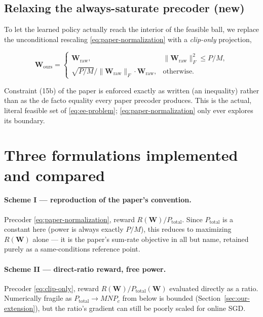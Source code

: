 \documentclass[11pt]{article}
\begin{document}
\subsection{Relaxing the always-saturate precoder (new)}

To let the learned policy actually reach the interior of the feasible ball,
we replace the unconditional rescaling \eqref{eq:paper-normalization} with a
\emph{clip-only} projection,

\begin{equation}
  \mathbf{W}_{\text{ours}} =
  \begin{cases}
    \mathbf{W}_{\text{raw}}, & \|\mathbf{W}_{\text{raw}}\|_F^2 \le P/M, \\[4pt]
    \sqrt{P/M}/\|\mathbf{W}_{\text{raw}}\|_F \cdot \mathbf{W}_{\text{raw}}, & \text{otherwise.}
  \end{cases}
  \label{eq:clip-only}
\end{equation}

Constraint (15b) of the paper is enforced exactly as written (an inequality)
rather than as the de facto equality every paper precoder produces. This is
the actual, literal feasible set of \eqref{eq:ee-problem}; \eqref{eq:paper-normalization}
only ever explores its boundary.

\section{Three formulations implemented and compared}
\label{sec:schemes}

\paragraph{Scheme I --- reproduction of the paper's convention.} Precoder
\eqref{eq:paper-normalization}, reward $R(\mathbf{W})/P_{\text{total}}$. Since
$P_{\text{total}}$ is a constant here (power is always exactly $P/M$), this
reduces to maximizing $R(\mathbf{W})$ alone --- it is the paper's sum-rate
objective in all but name, retained purely as a same-conditions reference
point.

\paragraph{Scheme II --- direct-ratio reward, free power.} Precoder
\eqref{eq:clip-only}, reward $R(\mathbf{W})/P_{\text{total}}(\mathbf{W})$
evaluated directly as a ratio. Numerically fragile as
$P_{\text{total}}\to MNP_c$ from below is bounded (Section~\ref{sec:our-extension}),
but the ratio's gradient can still be poorly scaled for online SGD.
\end{document}
